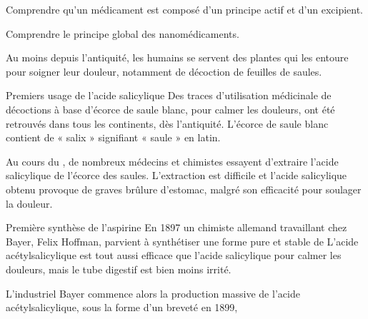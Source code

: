 \teteTermStssMedi
{}

\begin{objectifs}
  \item Comprendre qu'un médicament est composé d'un principe actif et d'un excipient.
  \item Comprendre le principe global des nanomédicaments.
\end{objectifs}

\begin{contexte}
  Au moins depuis l'antiquité, les humains se servent des plantes qui les entoure pour soigner leur douleur, notamment de décoction de feuilles de saules.
  
\end{contexte}


\begin{doc}{Premiers usage de l'acide salicylique}
  Des traces d'utilisation médicinale de décoctions à base d'écorce de saule blanc, pour calmer les douleurs, ont été retrouvés dans tous les continents, dès l'antiquité.
  L'écorce de saule blanc contient de  « salix » signifiant « saule » en latin.

  Au cours du \!, de nombreux médecins et chimistes essayent d'extraire l'acide salicylique de l'écorce des saules. 
  L'extraction est difficile et l'acide salicylique obtenu provoque de graves brûlure d'estomac, malgré son efficacité pour soulager la douleur.
\end{doc}

\begin{doc}{Première synthèse de l'aspirine}
  En 1897 un chimiste allemand travaillant chez Bayer, Felix Hoffman, parvient à synthétiser une forme pure et stable de
  L'acide acétylsalicylique est tout aussi efficace que l'acide salicylique pour calmer les douleurs, mais le tube digestif est bien moins irrité.

  L'industriel Bayer commence alors la production massive de l'acide acétylsalicylique, sous la forme d'un  breveté en 1899, 
\end{doc}

